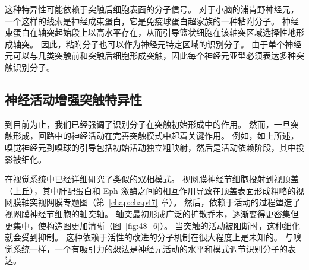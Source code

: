 这种特异性可能依赖于突触后细胞表面的分子信号。
对于小脑的浦肯野神经元，一个这样的线索是神经成束蛋白，它是免疫球蛋白超家族的一种粘附分子。
神经束蛋白在轴突起始段上以高水平存在，从而引导篮状细胞在该轴突区域选择性地形成轴突。
因此，粘附分子也可以作为神经元特定区域的识别分子。
由于单个神经元可以与几类突触前和突触后细胞形成突触，因此每个神经元亚型必须表达多种突触识别分子。



\subsection{神经活动增强突触特异性}


到目前为止，我们已经强调了识别分子在突触初始形成中的作用。
然而，一旦突触形成，回路中的神经活动在完善突触模式中起着关键作用。
例如，如上所述，嗅觉神经元到嗅球的引导包括初始活动独立粗映射，然后是活动依赖阶段，其中投影被细化。


在视觉系统中已经详细研究了类似的双相模式。
视网膜神经节细胞投射到视顶盖（上丘），其中肝配蛋白和 Eph 激酶之间的相互作用导致在顶盖表面形成粗略的视网膜轴突视网膜专题图（第~\ref{chap:chap47} 章）。
然后，依赖于活动的过程塑造了视网膜神经节细胞的轴突轴。
轴突最初形成广泛的扩散乔木，逐渐变得更密集但更集中，使构造图更加清晰（图~\ref{fig:48_6}）。
当突触的活动被阻断时，这种细化就会受到抑制。
这种依赖于活性的改进的分子机制在很大程度上是未知的。
与嗅觉系统一样，一个有吸引力的想法是神经元活动的水平和模式调节识别分子的表达。


